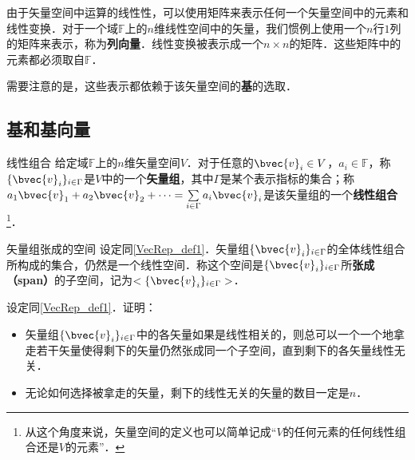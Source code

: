 
\begin{issues}
\end{issues}


由于矢量空间中运算的线性性，可以使用矩阵来表示任何一个矢量空间中的元素和线性变换．对于一个域$\mathbb{F}$上的$n$维线性空间中的矢量，我们惯例上使用一个$n$行$1$列的矩阵来表示，称为\textbf{列向量}．线性变换被表示成一个$n\times n$的矩阵．这些矩阵中的元素都必须取自$\mathbb{F}$．

需要注意的是，这些表示都依赖于该矢量空间的\textbf{基}的选取．

\subsection{基和基向量}

\begin{definition}{线性组合}\label{VecRep_def1}
给定域$\mathbb{F}$上的$n$维矢量空间$V$．对于任意的$\bvec{v}_i\in V$，$a_i\in\mathbb{F}$，称$\{\bvec{v}_i\}_{i\in\Gamma}$是$V$中的一个\textbf{矢量组}，其中$\Gamma$是某个表示指标的集合；称$a_1\bvec{v}_1+a_2\bvec{v}_2+\cdots=\sum\limits_{i\in\Gamma}a_i\bvec{v}_i$是该矢量组的一个\textbf{线性组合}\footnote{从这个角度来说，矢量空间的定义也可以简单记成“$V$的任何元素的任何线性组合还是$V$的元素”．}．
\end{definition}

\begin{definition}{矢量组张成的空间}
设定同\autoref{VecRep_def1}．矢量组$\{\bvec{v}_i\}_{i\in\Gamma}$的全体线性组合所构成的集合，仍然是一个线性空间．称这个空间是$\{\bvec{v}_i\}_{i\in\Gamma}$所\textbf{张成（span）}的子空间，记为$<\{\bvec{v}_i\}_{i\in\Gamma}>$．
\end{definition}

\begin{exercise}{}
设定同\autoref{VecRep_def1}．证明：
\begin{itemize}
\item 矢量组$\{\bvec{v}_i\}_{i\in\Gamma}$中的各矢量如果是线性相关的，则总可以一个一个地拿走若干矢量使得剩下的矢量仍然张成同一个子空间，直到剩下的各矢量线性无关．
\item 无论如何选择被拿走的矢量，剩下的线性无关的矢量的数目一定是$n$．
\end{itemize}
\end{exercise}

